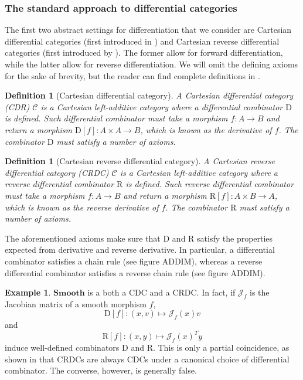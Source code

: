 \documentclass[12pt,a4paper,openright,twoside]{report}
\theoremstyle{plain}
\newtheorem{definition}[proposition]{Definition}
\theoremstyle{definition}
\newtheorem{example}[proposition]{Example}
\begin{document}
\subsubsection{The standard approach to differential categories}


The first two abstract settings for differentiation that we consider are Cartesian differential categories (first introduced in \cite{blute2006differential}) and Cartesian reverse differential categories (first introduced by \cite{cockett2019reverse}). The former allow for forward differentiation, while the latter allow for reverse differentiation. We will omit the defining axioms for the sake of brevity, but the reader can find complete definitions in \cite{cockett2019reverse}.

\begin{definition}[Cartesian differential category]
  A Cartesian differential category (CDR) $\mathcal{C}$ is a Cartesian left-additive category where a differential combinator $\mathrm{D}$ is defined. Such differential combinator must take a morphism $f: A \to B$ and return a morphism $\mathrm{D}[f]: A \times A \to B$, which is known as the derivative of $f$. The combinator $\mathrm{D}$ must satisfy a number of axioms. 
\end{definition}

\begin{definition}[Cartesian reverse differential category]
  A Cartesian reverse differential category (CRDC) $\mathcal{C}$ is a Cartesian left-additive category where a reverse differential combinator $\mathrm{R}$ is defined. Such reverse differential combinator must take a morphism $f: A \to B$ and return a morphism $\mathrm{R}[f]: A \times B \to A$, which is known as the reverse derivative of $f$. The combinator $\mathrm{R}$ must satisfy a number of axioms. 
\end{definition}


The aforementioned axioms make sure that $\mathrm{D}$ and $\mathrm{R}$ satisfy the properties expected from derivative and reverse derivative. In particular, a differential combinator satisfies a chain rule (see figure ADDIM), whereas a reverse differential combinator satisfies a reverse chain rule (see figure ADDIM).


\begin{example}
  $\mathbf{Smooth}$ is a both a CDC and a CRDC. In fact, if $\mathcal{J}_f$ is the Jacobian matrix of a smooth morphism $f$,
  \[\mathrm{D}[f]: (x,v) \mapsto \mathcal{J}_f(x)v\]
  and
  \[\mathrm{R}[f]: (x,y) \mapsto \mathcal{J}_f(x)^Ty\]
  induce well-defined combinators $\mathrm{D}$ and $\mathrm{R}$. This is only a partial coincidence, as shown in \cite{cockett2019reverse} that CRDCs are always CDCs under a canonical choice of differential combinator. The converse, however, is generally false.
\end{example}
\end{document}
